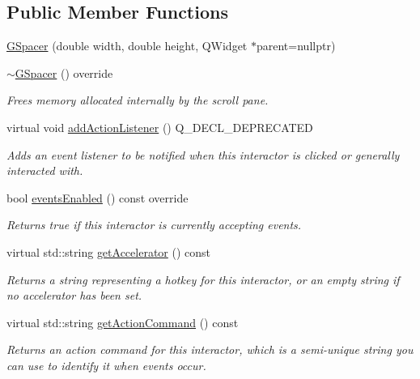 \subsection*{Public Member Functions}
\begin{DoxyCompactItemize}
\item 
\mbox{\hyperlink{classGSpacer_abbd146cc21cc285a4b4b388dd57b9ffa}{G\+Spacer}} (double width, double height, Q\+Widget $\ast$parent=nullptr)
\item 
\mbox{\hyperlink{classGSpacer_a20f146a52fc612e051e0b8f2cdf18a8d}{$\sim$\+G\+Spacer}} () override
\begin{DoxyCompactList}\small\item\em Frees memory allocated internally by the scroll pane. \end{DoxyCompactList}\item 
virtual void \mbox{\hyperlink{classGInteractor_a02f20ea6edfa0671f31c4c648a253833}{add\+Action\+Listener}} () Q\+\_\+\+D\+E\+C\+L\+\_\+\+D\+E\+P\+R\+E\+C\+A\+T\+ED
\begin{DoxyCompactList}\small\item\em Adds an event listener to be notified when this interactor is clicked or generally interacted with. \end{DoxyCompactList}\item 
bool \mbox{\hyperlink{classGInteractor_a597a370b592e3737d38d9d2f4e2031ea}{events\+Enabled}} () const override
\begin{DoxyCompactList}\small\item\em Returns true if this interactor is currently accepting events. \end{DoxyCompactList}\item 
virtual std\+::string \mbox{\hyperlink{classGInteractor_a69f8d23ed8f207fbecad99960776e942}{get\+Accelerator}} () const
\begin{DoxyCompactList}\small\item\em Returns a string representing a hotkey for this interactor, or an empty string if no accelerator has been set. \end{DoxyCompactList}\item 
virtual std\+::string \mbox{\hyperlink{classGInteractor_a94eb4276000c4fdfb508ce9e6317a82a}{get\+Action\+Command}} () const
\begin{DoxyCompactList}\small\item\em Returns an action command for this interactor, which is a semi-\/unique string you can use to identify it when events occur. \end{DoxyCompactList}\item 

\end{DoxyCompactItemize}
